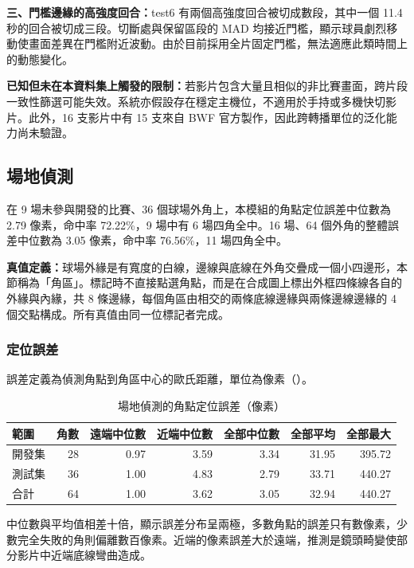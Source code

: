 \textbf{三、門檻邊緣的高強度回合：}test6 有兩個高強度回合被切成數段，其中一個 11.4 秒的回合被切成三段。切斷處與保留區段的 MAD 均接近門檻，顯示球員劇烈移動使畫面差異在門檻附近波動。由於目前採用全片固定門檻，無法適應此類時間上的動態變化。

\textbf{已知但未在本資料集上觸發的限制：}若影片包含大量且相似的非比賽畫面，跨片段一致性篩選可能失效。系統亦假設存在穩定主機位，不適用於手持或多機快切影片。此外，16 支影片中有 15 支來自 BWF 官方製作，因此跨轉播單位的泛化能力尚未驗證。

\subsection{場地偵測}
\label{sec:exp-court}

在 9 場未參與開發的比賽、36 個球場外角上，本模組的角點定位誤差中位數為 2.79 像素，命中率 72.22\%，9 場中有 6 場四角全中。16 場、64 個外角的整體誤差中位數為 3.05 像素，命中率 76.56\%，11 場四角全中。

\textbf{真值定義：}球場外緣是有寬度的白線，邊線與底線在外角交疊成一個小四邊形，本節稱為「角區」。標記時不直接點選角點，而是在合成圖上標出外框四條線各自的外緣與內緣，共 8 條邊緣，每個角區由相交的兩條底線邊緣與兩條邊線邊緣的 4 個交點構成。所有真值由同一位標記者完成。

\subsubsection{定位誤差}

誤差定義為偵測角點到角區中心的歐氏距離，單位為像素（）。

\begin{table}[htbp]
  \centering
  \small
  \caption{場地偵測的角點定位誤差（像素）}
  \label{tab:court-error}
  \begin{tabular}{|l|r|r|r|r|r|r|}
    \hline
    範圍 & 角數 & 遠端中位數 & 近端中位數 & 全部中位數 & 全部平均 & 全部最大 \\ \hline
    開發集 & 28 & 0.97 & 3.59 & 3.34 & 31.95 & 395.72 \\ \hline
    測試集 & 36 & 1.00 & 4.83 & 2.79 & 33.71 & 440.27 \\ \hline
    合計 & 64 & 1.00 & 3.62 & 3.05 & 32.94 & 440.27 \\ \hline
  \end{tabular}
\end{table}

中位數與平均值相差十倍，顯示誤差分布呈兩極，多數角點的誤差只有數像素，少數完全失敗的角則偏離數百像素。近端的像素誤差大於遠端，推測是鏡頭畸變使部分影片中近端底線彎曲造成。

